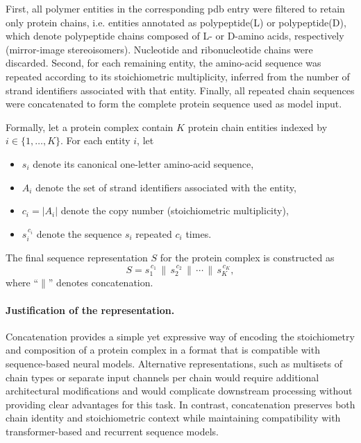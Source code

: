 First, all polymer entities in the corresponding \gls{pdb} entry were filtered to retain only protein chains, i.e. entities annotated as polypeptide(L) or polypeptide(D), which denote polypeptide chains composed of L- or D-amino acids, respectively (mirror-image stereoisomers).
Nucleotide and ribonucleotide chains were discarded. Second, for each remaining entity, the amino-acid sequence was repeated according to its stoichiometric multiplicity, inferred from the number of strand identifiers associated with that entity. Finally, all repeated chain sequences were concatenated to form the complete protein sequence used as model input.

Formally, let a protein complex contain $K$ protein chain entities indexed by $i \in \{1,\dots,K\}$. For each entity $i$, let
\begin{itemize}
	\item $s_i$ denote its canonical one-letter amino-acid sequence,
	\item $A_i$ denote the set of strand identifiers associated with the entity,
	\item $c_i = |A_i|$ denote the copy number (stoichiometric multiplicity),
	\item $s_i^{\,c_i}$ denote the sequence $s_i$ repeated $c_i$ times.
\end{itemize}
The final sequence representation $S$ for the protein complex is constructed as
\begin{equation}
	S = s_1^{\,c_1} \,\|\, s_2^{\,c_2} \,\|\, \cdots \,\|\, s_K^{\,c_K},
\end{equation}
where ``$\|$'' denotes concatenation.

\paragraph{Justification of the representation.}
Concatenation provides a simple yet expressive way of encoding the stoichiometry and composition of a protein complex in a format that is compatible with sequence-based neural models. Alternative representations, such as multisets of chain types or separate input channels per chain would require additional architectural modifications and would complicate downstream processing without providing clear advantages for this task. In contrast, concatenation preserves both chain identity and stoichiometric context while maintaining compatibility with transformer-based and recurrent sequence models. \\

